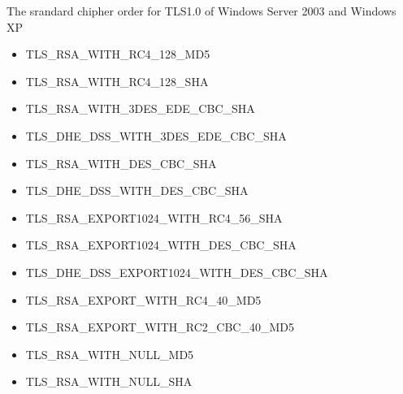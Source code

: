 The srandard chipher order for TLS1.0 of Windows Server 2003 and Windows XP
\begin{itemize}
\item TLS_RSA_WITH_RC4_128_MD5
\item TLS_RSA_WITH_RC4_128_SHA
\item TLS_RSA_WITH_3DES_EDE_CBC_SHA
\item TLS_DHE_DSS_WITH_3DES_EDE_CBC_SHA
\item TLS_RSA_WITH_DES_CBC_SHA
\item TLS_DHE_DSS_WITH_DES_CBC_SHA
\item TLS_RSA_EXPORT1024_WITH_RC4_56_SHA
\item TLS_RSA_EXPORT1024_WITH_DES_CBC_SHA
\item TLS_DHE_DSS_EXPORT1024_WITH_DES_CBC_SHA
\item TLS_RSA_EXPORT_WITH_RC4_40_MD5
\item TLS_RSA_EXPORT_WITH_RC2_CBC_40_MD5
\item TLS_RSA_WITH_NULL_MD5
\item TLS_RSA_WITH_NULL_SHA
\end{itemize}

